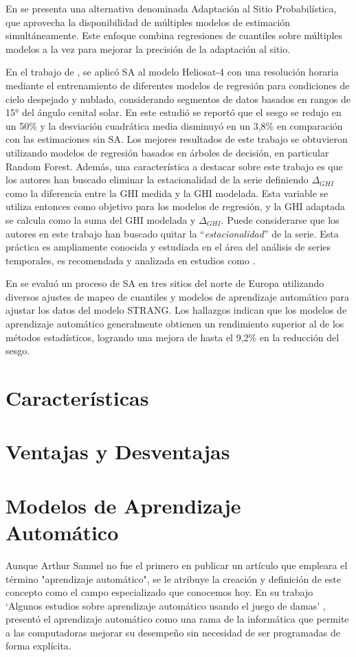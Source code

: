 En \citep{YANG2021} se presenta una alternativa denominada Adaptación al Sitio Probabilística, que aprovecha la disponibilidad de múltiples modelos de estimación simultáneamente. Este enfoque combina regresiones de cuantiles sobre múltiples modelos a la vez para mejorar la precisión de la adaptación al sitio.

En el trabajo de \citep{SALAMALIKIS2022}, se aplicó SA al modelo Heliosat-4 con una resolución horaria mediante el entrenamiento de diferentes modelos de regresión para condiciones de cielo despejado y nublado, considerando segmentos de datos basados en rangos de 15° del ángulo cenital solar. En este estudió se reportó  que el sesgo se redujo en un 50\% y la desviación cuadrática media disminuyó en un 3,8\% en comparación con las estimaciones sin SA. Los mejores resultados de este trabajo se obtuvieron utilizando modelos de regresión basados en árboles de decisión, en particular Random Forest. Además, una característica a destacar sobre este trabajo es que los autores han buscado eliminar la estacionalidad de la serie definiendo $\Delta_{GHI}$ como la diferencia entre la GHI medida y la GHI modelada. Esta variable se utiliza entonces como objetivo para los modelos de regresión, y la GHI adaptada se calcula como la suma del GHI modelada y $\Delta_{GHI}$. Puede considerarse que los autores en este trabajo han buscado quitar la \enquote{\textit{estacionalidad}} de la serie. Esta práctica es ampliamente conocida y estudiada en el área del análisis de series temporales, es recomendada y analizada en estudios como \citep{THORNTON2013, Claveria2015}.   


En \citep{ZAINALI2024} se evaluó un proceso de SA en tres sitios del norte de Europa utilizando diversos ajustes de mapeo de cuantiles y modelos de aprendizaje automático para ajustar los datos del modelo STRANG. Los hallazgos indican que los modelos de aprendizaje automático generalmente obtienen un rendimiento superior al de los métodos estadísticos, logrando una mejora de hasta el 9,2\% en la reducción del sesgo.




\section{Características}
\section{Ventajas y Desventajas}


\section{Modelos de Aprendizaje Automático} \label{MLM}
Aunque Arthur Samuel no fue el primero en publicar un artículo que empleara el término "aprendizaje automático", se le atribuye la creación y definición de este concepto como el campo especializado que conocemos hoy. En su trabajo `Algunos estudios sobre aprendizaje automático usando el juego de damas' \cite{samuel1959}, presentó el aprendizaje automático como una rama de la informática que permite a las computadoras mejorar su desempeño sin necesidad de ser programadas de forma explícita.

